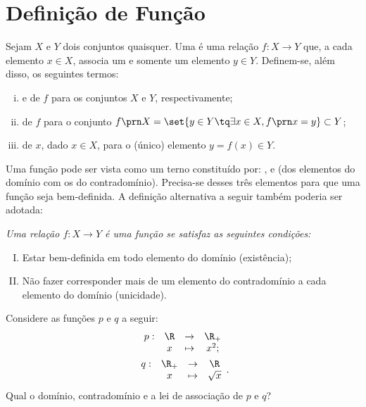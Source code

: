 \section{Definição de Função}

\begin{definition}
Sejam $X$ e $Y$ dois conjuntos quaisquer.
Uma  é uma relação $f: X \to Y$ que, a cada elemento $x \in X$, associa um e somente um elemento $y \in Y$.
Definem-se, além disso, os seguintes termos:
%
\begin{enumerate}[(i)]
  \item {} e  de $f$ para os conjuntos $X$ e $Y$, respectivamente;
  \item {} de $f$ para o conjunto $f\prn X = \set{y \in Y \tq \exists x \in X , f \prn x =
  y} \subset Y$;
  \item {} de $x$, dado $x \in X$, para o (único) elemento $y = f(x) \in Y$.
\end{enumerate}
\end{definition}

\begin{remark}
Uma função pode ser vista como um terno constituído por: ,  e  (dos elementos do
domínio com os do contradomínio). Precisa-se desses três elementos para que uma função seja bem-definida. A definição alternativa a seguir também poderia ser adotada:

{\it Uma relação $f: X \to Y$ é uma \emph {função} se satisfaz as seguintes condições:
%
\begin{enumerate}[(I)]
  \item Estar bem-definida em todo elemento do domínio (existência);
  \item Não fazer corresponder mais de um elemento do contradomínio
  a cada elemento do domínio (unicidade).
\end{enumerate}}
\end{remark}

\begin{example}
\label{example:func-sq-sqrt}
Considere as funções $p$ e $q$ a seguir:
%
\begin{gather*}
\begin{array}{cccc}
p : & \R & \to     & \R_+ \\
     &  x & \mapsto & x^2;
\end{array}\\
\begin{array}{cccc}
q : & \R_+ & \to     & \R \\
     &  x & \mapsto & \sqrt x
\end{array}.
\end{gather*}
%
Qual o domínio, contradomínio e a lei de associação de $p$ e $q$?
\end{example}

